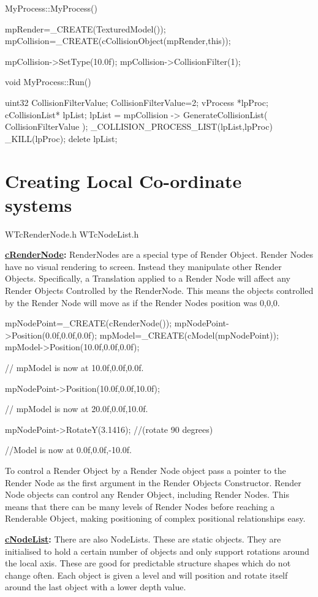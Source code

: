 \begin{DoxyCode}
 MyProcess::MyProcess()
 {
  mpRender=_CREATE(TexturedModel());
  mpCollision=_CREATE(cCollisionObject(mpRender,this));

  mpCollision->SetType(10.0f);
  mpCollision->CollisionFilter(1);
 }

 void MyProcess::Run()
 {
 uint32 CollisionFilterValue;
 CollisionFilterValue=2;
  vProcess *lpProc;
  cCollisionList* lpList;
  lpList = mpCollision -> GenerateCollisionList( CollisionFilterValue );
        _COLLISION_PROCESS_LIST(lpList,lpProc)
        {
                                _KILL(lpProc);
        }
        delete lpList;

 }
\end{DoxyCode}
 \hypertarget{_using_engine_page_RenderNodesPage}{}\section{Creating Local Co-\/ordinate systems}\label{_using_engine_page_RenderNodesPage}
WTcRenderNode.h WTcNodeList.h

{\bfseries  \hyperlink{classc_render_node}{cRenderNode}: } RenderNodes are a special type of Render Object. Render Nodes have no visual rendering to screen. Instead they manipulate other Render Objects. Specifically, a Translation applied to a Render Node will affect any Render Objects Controlled by the RenderNode. This means the objects controlled by the Render Node will move as if the Render Nodes position was 0,0,0.


\begin{DoxyCode}
 mpNodePoint=_CREATE(cRenderNode());
 mpNodePoint->Position(0.0f,0.0f,0.0f);
 mpModel=_CREATE(cModel(mpNodePoint));
 mpModel->Position(10.0f,0.0f,0.0f);

 // mpModel is now at 10.0f,0.0f,0.0f.

 mpNodePoint->Position(10.0f,0.0f,10.0f);

 // mpModel is now at 20.0f,0.0f,10.0f.

 mpNodePoint->RotateY(3.1416); //(rotate 90 degrees)

 //Model is now at 0.0f,0.0f,-10.0f.
\end{DoxyCode}


To control a Render Object by a Render Node object pass a pointer to the Render Node as the first argument in the Render Objects Constructor. Render Node objects can control any Render Object, including Render Nodes. This means that there can be many levels of Render Nodes before reaching a Renderable Object, making positioning of complex positional relationships easy. \par
 \par
 {\bfseries  \hyperlink{classc_node_list}{cNodeList}:} There are also NodeLists. These are static objects. They are initialised to hold a certain number of objects and only support rotations around the local axis. These are good for predictable structure shapes which do not change often. Each object is given a level and will position and rotate itself around the last object with a lower depth value.


